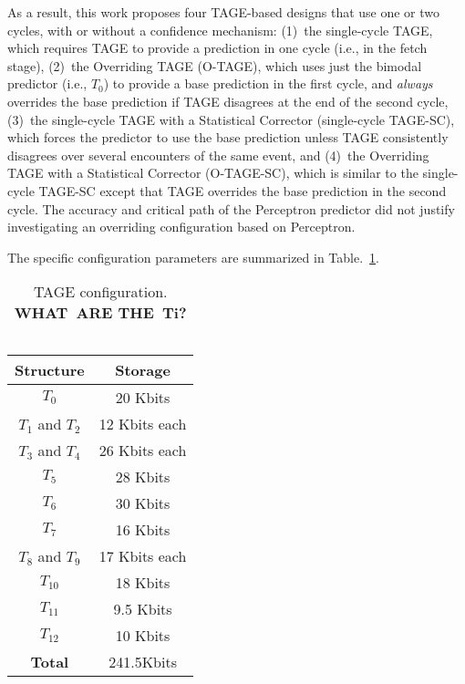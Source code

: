 As a result, this work proposes four TAGE-based designs that use one or two cycles, with or without a confidence mechanism:  (1)~the single-cycle TAGE, which requires TAGE to provide a prediction in one cycle (i.e., in the fetch stage), (2)~the Overriding TAGE (\mbox{O-TAGE}), which uses just the bimodal predictor (i.e., $T_0$) to provide a base prediction in the first cycle, and \textit{always} overrides the base prediction if TAGE disagrees at the end of the second cycle, (3)~the single-cycle TAGE with a Statistical Corrector (single-cycle \mbox{TAGE-SC}), which forces the predictor to use the base prediction unless TAGE consistently disagrees over several encounters of the same event, and (4)~the Overriding TAGE with a Statistical Corrector (\mbox{O-TAGE-SC}), which is similar to the single-cycle \mbox{TAGE-SC} except that TAGE overrides the base prediction in the second cycle. The accuracy and critical path of the Perceptron predictor did not justify investigating an overriding configuration based on Perceptron.

The specific configuration parameters are summarized in Table.~\ref{tab:tageconfig}. 

\begin{table}[h]
\begin{center}
\begin{tabular} {|c|c|}
\hline
\textbf{Structure} & \textbf{Storage} \\ \hline
$T_0$ & 20 Kbits\\
$T_1$ and $T_2$ & 12 Kbits each\\
$T_3$ and $T_4$ & 26 Kbits each\\
$T_5$ & 28 Kbits\\
$T_6$ & 30 Kbits\\
$T_7$ & 16 Kbits\\
$T_8$ and $T_9$ & 17 Kbits each\\
$T_{10}$ & 18 Kbits\\
$T_{11}$ & 9.5 Kbits\\
$T_{12}$ & 10 Kbits\\ \hline
\textbf{Total} & 241.5Kbits \\ \hline
\end{tabular}
\caption{TAGE configuration. \textbf{WHAT\ ARE THE\ Ti? \ \ }\label{tab:tageconfig}}
\end{center}
\end{table}



